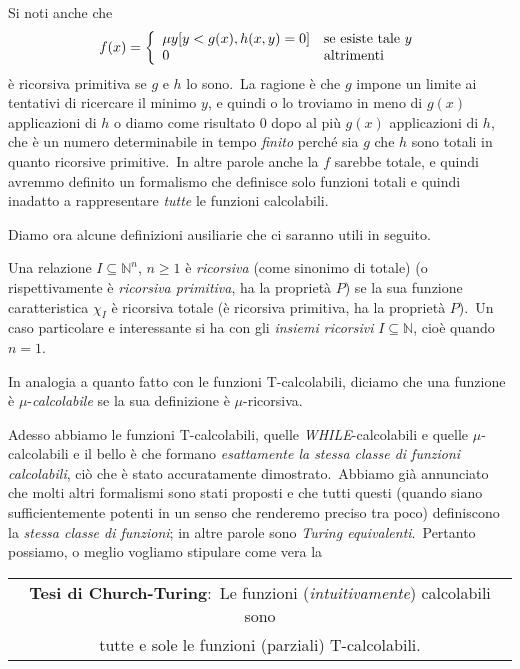 Si noti anche che
\[f(x) =\left\{\begin{array}{l l}
        \mu y[y<g(x), h(x,y) = 0] & \mathrm{se\ esiste\ tale}\ y \\
        0                         & \mathrm{altrimenti}          \\
    \end{array}\right.\]
è ricorsiva primitiva se $g$ e $h$ lo sono.\
La ragione è che $g$ impone un limite ai tentativi di ricercare il minimo $y$, e quindi o lo troviamo in meno di $g(x)$ applicazioni di $h$ o diamo come risultato 0 dopo al più $g(x)$ applicazioni di $h$, che è un numero determinabile in tempo \textit{finito} perché sia $g$ che $h$ sono totali in quanto ricorsive primitive.\
In altre parole anche la $f$ sarebbe totale, e quindi avremmo definito un formalismo che definisce solo funzioni totali e quindi inadatto a rappresentare \textit{tutte} le funzioni calcolabili.

Diamo ora alcune definizioni ausiliarie che ci saranno utili in seguito.

\begin{definition}
    Una relazione $I \subseteq \mathbb{N}^n$, $n \geq 1$ è \textit{ricorsiva} (come sinonimo di totale) (o rispettivamente è \textit{ricorsiva primitiva}, ha la proprietà $P$) se la sua funzione caratteristica $\chi_I$ è ricorsiva totale (è ricorsiva primitiva, ha la proprietà $P$).\
    Un caso particolare e interessante si ha con gli \textit{insiemi ricorsivi} $I \subseteq \mathbb{N}$, cioè quando $n = 1$.
\end{definition}

\noindent In analogia a quanto fatto con le funzioni T-calcolabili, diciamo che una funzione è $\mu$-\textit{calcolabile} se la sua definizione è $\mu$-ricorsiva.\

Adesso abbiamo le funzioni T-calcolabili, quelle \textit{\footnotesize WHILE}-calcolabili e quelle $\mu$-calcolabili e il bello è che formano \textit{esattamente la stessa classe di funzioni calcolabili}, ciò che è stato accuratamente dimostrato.\
Abbiamo già annunciato che molti altri formalismi sono stati proposti e che tutti questi (quando siano sufficientemente potenti in un senso che renderemo preciso tra poco) definiscono la \textit{stessa classe di funzioni}; in altre parole sono \textit{Turing equivalenti}.\
Pertanto possiamo, o meglio vogliamo stipulare come vera la

\begin{table}[H]
    \centering
    \begin{tabular}{|c|}
        \hline
        \textbf{Tesi di Church-Turing}:\ Le funzioni (\textit{intuitivamente}) calcolabili sono \\
        tutte e sole le funzioni (parziali) T-calcolabili.                                      \\\hline
    \end{tabular}
\end{table}

